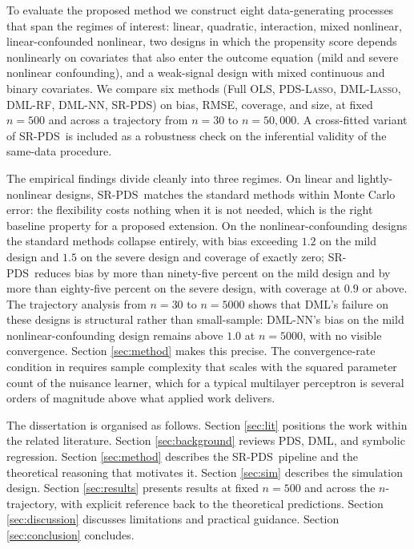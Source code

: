 \documentclass[11pt, a4paper]{article}
\theoremstyle{plain}
\theoremstyle{definition}
\theoremstyle{remark}
\newcommand{\lasso}{\textsc{Lasso}}
\newcommand{\pds}{\textsc{PDS}}
\newcommand{\dml}{\textsc{DML}}
\newcommand{\epds}{\textsc{SR-PDS}}
\begin{document}
To evaluate the proposed method we construct eight data-generating
processes that span the regimes of interest: linear, quadratic,
interaction, mixed nonlinear, linear-confounded nonlinear, two
designs in which the propensity score depends nonlinearly on
covariates that also enter the outcome equation (mild and severe
nonlinear confounding), and a weak-signal design with mixed
continuous and binary covariates. We compare six methods (Full
OLS, \pds-\lasso, \dml-\lasso, \dml-RF, \dml-NN, \epds) on bias,
RMSE, coverage, and size, at fixed $n=500$ and across a
trajectory from $n=30$ to $n=50{,}000$. A cross-fitted variant of
\epds\ is included as a robustness check on the inferential
validity of the same-data procedure.

The empirical findings divide cleanly into three regimes. On
linear and lightly-nonlinear designs, \epds\ matches the
standard methods within Monte Carlo error: the flexibility
costs nothing when it is not needed, which is the right
baseline property for a proposed extension. On the
nonlinear-confounding designs the standard methods collapse
entirely, with bias exceeding $1.2$ on the mild design and
$1.5$ on the severe design and coverage of exactly zero;
\epds\ reduces bias by more than ninety-five
percent on the mild design and by more than eighty-five percent
on the severe design, with coverage at $0.9$ or above. The
trajectory analysis from $n=30$ to $n=5000$ shows that \dml's
failure on these designs is structural rather than small-sample:
\dml-NN's bias on the mild nonlinear-confounding design remains
above $1.0$ at $n=5000$, with no visible convergence. Section
\ref{sec:method} makes this precise. The convergence-rate
condition in \citet{chernozhukov2018} requires sample complexity
that scales with the squared parameter count of the nuisance
learner, which for a typical multilayer perceptron is several
orders of magnitude above what applied work delivers.

The dissertation is organised as follows. Section \ref{sec:lit}
positions the work within the related literature. Section
\ref{sec:background} reviews \pds, \dml, and symbolic
regression. Section \ref{sec:method} describes the \epds\
pipeline and the theoretical reasoning that motivates it. Section
\ref{sec:sim} describes the simulation design. Section
\ref{sec:results} presents results at fixed $n=500$ and across the
$n$-trajectory, with explicit reference back to the theoretical
predictions. Section \ref{sec:discussion} discusses limitations and
practical guidance. Section \ref{sec:conclusion} concludes.
\end{document}
